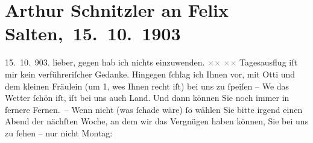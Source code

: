 

         
         \renewcommand{\erwaehntePersonen}{Personen: Caroline Kotter, Felix Salten, Ottilie Salten}
         \renewcommand{\erwaehnteInstitutionen}{Institutionen: Neue akademische Vereinigung}
         \renewcommand{\erwaehnteOrte}{Orte: Brünn, Deutsches Haus, Wien}
         \renewcommand{\erwaehnteWerke}{}
               \section[ Arthur Schnitzler an Felix Salten, 15. 10. 1903]{ Arthur Schnitzler an Felix Salten, 15. 10. 1903}\nopagebreak{}\rehead{ }\begin{ledgroupsized}[t]{13cm}\normalsize\beginnumbering \toendnotes[C]{\smallbreak\pagebreak[2]} 
\toendnotes[C]{\smallbreak}\pstart
           \raggedleft{}{\pb}15. 10. 903.\pend
           \pstart
           lieber, gegen \label{K_L02985-1v}\label{K_L02985-1h} hab ich nichts einzuwenden. \textcolor{gray}{×}\-\textcolor{gray}{×}{ }\textcolor{gray}{×}\-\textcolor{gray}{×}\pend
           \pstart
           Tagesausflug iſt mir kein verführeriſcher Gedanke. Hingegen ſchlag ich Ihnen vor, mit
                  Otti und dem kleinen Fräulein\label{K_L02985-2v}\label{K_L02985-2h} (um 1, we{\geminationn}s {\pb}Ihnen recht iſt) bei uns zu ſpeiſen – We{\geminationn} das Wetter ſchön iſt, iſt bei uns auch Land. Und dann
               können Sie noch immer in fernere Fernen. –\pend
           \pstart
           Wenn nicht (was ſchade wäre) ſo wählen Sie bitte irgend einen Abend der {\pb}nächſten Woche, an dem wir das Vergnügen
               haben können, Sie bei uns zu ſehen – nur nicht Montag:

\end{ledgroupsized}
